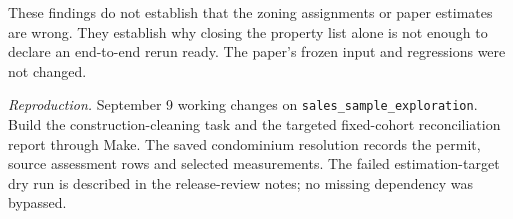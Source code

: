 These findings do not establish that the zoning assignments or paper estimates are wrong. They establish why closing the property list alone is not enough to declare an end-to-end rerun ready. The paper's frozen input and regressions were not changed.

\medskip
\noindent\textit{Reproduction.} September 9 working changes on \texttt{sales\_sample\_exploration}. Build the construction-cleaning task and the targeted fixed-cohort reconciliation report through Make. The saved condominium resolution records the permit, source assessment rows and selected measurements. The failed estimation-target dry run is described in the release-review notes; no missing dependency was bypassed.
